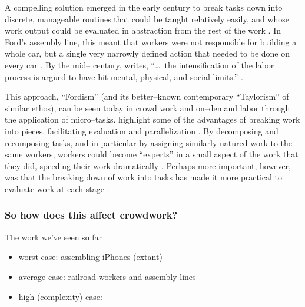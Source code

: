 \documentclass[trackingWork]{subfiles}
\begin{document}
{A compelling solution emerged in the early  century to break tasks down into discrete,
manageable routines that could be taught relatively easily,
and whose work output could be evaluated in abstraction from the rest of the work
\cite{restructuringPieceworkBaker}.
In Ford's assembly line, this meant that workers were not responsible for building a whole car,
but a single very narrowly defined action that needed to be done on every car
\cite{towardsGlobalFordism}.
By the mid-- century, \citeauthor{schoenberger1988fordism} writes,
``\dots~the intensification of the labor process is argued to have hit mental, physical, and social limits.''
\cite{schoenberger1988fordism}.

This approach, ``Fordism'' (and its better--known contemporary ``Taylorism'' of similar ethos),
can be seen today in crowd work and on--demand labor through the application of micro--tasks.
\citeauthor{writingMicroTasks} highlight some of the advantages of breaking work into pieces,
facilitating evaluation and parallelization
\cite{writingMicroTasks}.
By decomposing and recomposing tasks,
and in particular by assigning similarly natured work to the same workers,
workers could become ``experts'' in a small aspect of the work that they did,
speeding their work dramatically
\cite{delayAndOrderLasecki}.
Perhaps more important, however, was that
the breaking down of work into tasks has made it more practical to evaluate work at each stage
\cite{rogstadius2011assessment}.

\subsubsection{So how does this affect crowdwork?}
The work we've seen so far 
\begin{itemize}
  \item worst case: assembling iPhones (extant)
  \item average case: railroad workers and assembly lines
  \item high (complexity) case: 
\end{itemize}



}
\end{document}
